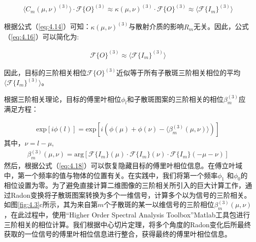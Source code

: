 \begin{equation}
\begin{aligned}
    \langle C_m(\mu,\nu)^{(3)} \rangle \cdot \mathcal{F}\{ O \}^{(3)} \approx \kappa(\mu,\nu)^{(3)}\cdot \mathcal{F}\{ O \}^{(3)} \approx   \langle \mathcal{F}\{ I_m \}^{(3)} \rangle
\end{aligned}
\label{eq:4.16}
\end{equation}

根据公式（\ref{eq:4.14}）可知：$\kappa(\mu,\nu)^{(3)}$与散射介质的影响$R_m$无关。因此，公式（\ref{eq:4.16}）可以简化为:

\begin{equation}
\begin{aligned}
   \mathcal{F}\{ O \}^{(3)} \approx   \langle \mathcal{F}\{ I_m \}^{(3)} \rangle
\end{aligned}
\label{eq:4.17}
\end{equation}

因此，目标的三阶相关相位$\mathcal{F}\{ O \}^{(3)}$近似等于所有子散斑三阶相关相位的平均$\langle \mathcal{F}\{ I_m \}^{(3)} \rangle$。

根据三阶相关理论，目标的傅里叶相位$\phi_{l}$和子散斑图案的三阶相关的相位$\beta_{m}^{(3)}$应满足方程：

\begin{equation}
\begin{aligned}
   \mbox{exp}[i\phi(l)]= \mbox{exp}\left[i(\phi(\mu)+\phi(\nu)- \langle {\beta_{m}^{(3)}(\mu,\nu)} \rangle)\right]
\end{aligned}
\label{eq:4.18}
\end{equation}其中，$\nu=l-\mu$,
\begin{equation}
\begin{aligned}
  {\beta_{m}^{(3)}(\mu,\nu)}= \mbox{arg}\left[\mathcal{F}\{I_m\}(\mu)\cdot \mathcal{F}\{I_m\}(\nu) \cdot \mathcal{F}\{I_m\}(-\mu-\nu)\right]
\end{aligned}
\label{eq:4.19}
\end{equation}
然后，根据公式（\ref{eq:4.18}）可以恢复隐藏目标的傅里叶相位信息。在傅立叶域中，第一个频率的值与物体的位置有关。在实践中，我们将第一个频率$\phi_{1}$ 和$\phi_{0}$的相位设置为零。为了避免直接计算二维图像的三阶相关所引入的巨大计算工作，通过Radon变换\cite{ayers_knoxthompson_1988}将子散斑图案转换为多个一维信号，计算多个以为信号的三阶相关。如图\ref{fig:4.3}c所示，其为来自第$m$个子散斑的某一以维信号的三阶相位${\beta_{m}^{(3)}(\mu,\nu)}$，在此过程中，使用“Higher Order
Spectral Analysis Toolbox”Matlab工具包进行三阶相关的相位计算。我们根据中心切片定理，将多个角度的Radon变化后所最终获取的一位信号的傅里叶相位信息进行整合，获得最终的傅里叶相位信息。

